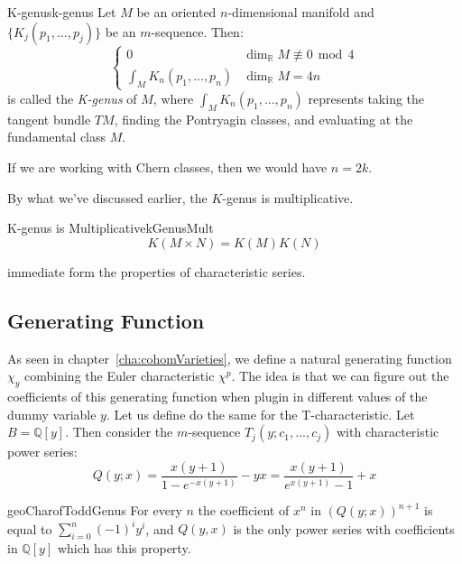 \documentclass{ut-thesis}
\newenvironment{Proof}[1][]
  {\begin{ProofTcb}[#1]}
  {\end{ProofTcb}}
\newcommand{\Q}{{\mathbb{Q}}}
\newcommand{\R}{{\mathbb{R}}}
\newcommand{\qn}{\quad\newline}
\renewcommand{\mod}{\,\operatorname{mod}\,}
\begin{document}
\begin{defn}{K-genus}{k-genus}
  Let $M$ be an oriented $n$-dimensional manifold and $\{K_j(p_1, ..., p_j)\}$ be an $m$-sequence. Then:
  \[
    \begin{cases}
      0 & \dim_\R M \not\equiv 0 \mod 4\\
      \int_M K_n(p_1, ..., p_n) & \dim_\R M = 4n
    \end{cases}
  \]
  is called the \emph{K-genus} of $M$, where $\int_M K_n(p_1, ..., p_n)$ represents taking the tangent bundle
  $TM$, finding the Pontryagin classes, and evaluating at the fundamental class $M$.

  \qn
  If we are working with Chern classes, then we would have $n=2k$.
\end{defn}

By what we've discussed earlier, the $K$-genus is multiplicative.
\begin{prop}{K-genus is Multiplicative}{kGenusMult}
  \[
    K(M\times N) = K(M)K(N)
  \]
\end{prop}

\begin{Proof}
  immediate form the properties of characteristic series.
\end{Proof}


\subsection{Generating Function}

As seen in chapter~\ref{cha:cohomVarieties}, we define a natural generating function $\chi_y$ combining the
Euler characteristic $\chi^p$. The idea is that we can figure out the coefficients of this generating
function when plugin in different values of the dummy variable $y$. Let us define do the same for the
T-characteristic. Let $B = \Q[y]$. Then consider the $m$-sequence $T_j(y; c_1, ..., c_j)$ with characteristic
power
series:
\[
  Q(y; x) = \frac{x(y+1)}{1-e^{-x(y+1)}} -yx = \frac{x(y+1)}{e^{x(y+1)}-1}+x
\]
\begin{lem}{}{geoCharofToddGenus}
  For every $n$ the coefficient of $x^n$ in $(Q(y;x))^{n+1}$ is equal to $\sum_{i=0}^n(-1)^iy^i$, and $Q(y,x)$
is the only power series with coefficients in $\mathbb{Q}[y]$ which has this property.
\end{lem}
\end{document}
